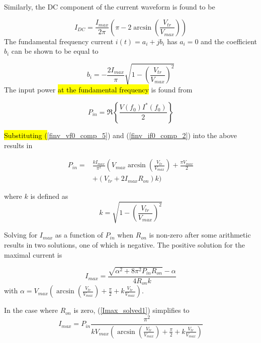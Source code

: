 Similarly, the DC component of the current waveform is found to be

\begin{equation}\label{finv_idc_comp_3}
    I_{DC} = \frac{I_{max}}{2\pi}\left(\pi - 2\arcsin\left(\frac{V_{tr}}{V_{max}}\right)\right)
\end{equation}
The fundamental frequency current $i(t)=a_i+jb_i$ has $a_i=0$ and the coefficient $b_i$ can be shown to be equal to

\begin{equation}\label{finv_if0_comp_2}
    b_i = -\frac{2I_{max}}{\pi}\sqrt{1 - \left(\frac{V_{tr}}{V_{max}}\right)^2}
\end{equation}
The input power \hl{at the fundamental frequency} is found from 


\begin{equation}\label{Pin}
  P_{in} = \Re\left\{\frac{V(f_0)I^{*}(f_0)}{2}\right\}
\end{equation}


\hl{Substituting (}\ref{finv_vf0_comp_5}) and (\ref{finv_if0_comp_2}) into the above results in

\begin{shaded}
\begin{equation}\begin{split}\label{Pin_diode2}
    P_{in} =& \frac{kI_{max}}{\pi^2}\left(V_{max}\arcsin\left(\frac{V_{tr}}{V_{max}}\right) + \frac{\pi V_{max}}{2} \right. \\
   &+ \left(V_{tr}+2I_{max}R_{on}\right)k\bigg)
\end{split}\end{equation}
\end{shaded}
where $k$ is defined as
\begin{equation}\label{k}
    k = \sqrt{1 - \left(\frac{V_{tr}}{V_{max}}\right)^2}
\end{equation}

Solving for $I_{max}$ as a function of $P_{in}$ when $R_{on}$ is non-zero after some arithmetic results in two solutions, one of which is negative. The positive solution for the maximal current is

\begin{equation}\label{Imax_solved1}
    I_{max} = \frac{ \sqrt{\alpha^2 + 8\pi^2P_{in}R_{on}}-\alpha}{4R_{on}k}
\end{equation}
with $\alpha=V_{max}\left(\arcsin\left(\frac{V_{tr}}{V_{max}}\right)+ \frac{\pi}{2} + k\frac{V_{tr}}{V_{max}}\right)$.

In the case where $R_{on}$ is zero, (\ref{Imax_solved1}) simplifies to
\begin{equation}\label{Imax_solve_zeroron_solved}
    I_{max} = P_{in}\frac{\pi^2}{kV_{max}\left(\arcsin\left(\frac{V_{tr}}{V_{max}}\right)+ \frac{\pi}{2} + k\frac{V_{tr}}{V_{max}}\right)}
\end{equation}

